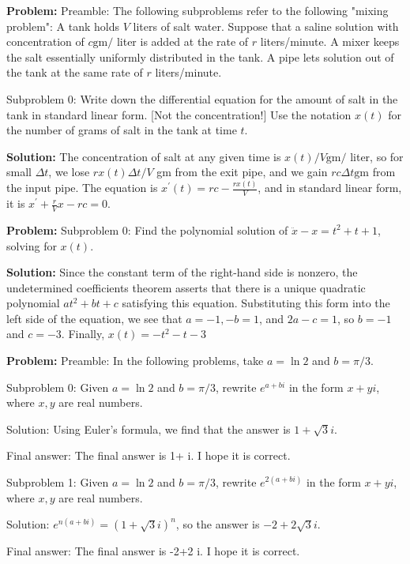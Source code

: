 \documentclass[10pt]{article}
\begin{document}
\textbf{Problem:}
Preamble: The following subproblems refer to the following "mixing problem": A tank holds $V$ liters of salt water. Suppose that a saline solution with concentration of $c \mathrm{gm} /$ liter is added at the rate of $r$ liters/minute. A mixer keeps the salt essentially uniformly distributed in the tank. A pipe lets solution out of the tank at the same rate of $r$ liters/minute. 

Subproblem 0: Write down the differential equation for the amount of salt in the tank in standard linear form. [Not the concentration!] Use the notation $x(t)$ for the number of grams of salt in the tank at time $t$.


\textbf{Solution:}
The concentration of salt at any given time is $x(t) / V \mathrm{gm} /$ liter, so for small $\Delta t$, we lose $r x(t) \Delta t / V$ gm from the exit pipe, and we gain $r c \Delta t \mathrm{gm}$ from the input pipe. The equation is $x^{\prime}(t)=r c-\frac{r x(t)}{V}$, and in standard linear form, it is
$\boxed{x^{\prime}+\frac{r}{V} x-r c=0}$.


\textbf{Problem:}
Subproblem 0: Find the polynomial solution of $\ddot{x}-x=t^{2}+t+1$, solving for $x(t)$.


\textbf{Solution:}
Since the constant term of the right-hand side is nonzero, the undetermined coefficients theorem asserts that there is a unique quadratic polynomial $a t^{2}+b t+c$ satisfying this equation. Substituting this form into the left side of the equation, we see that $a=-1,-b=1$, and $2 a-c=1$, so $b=-1$ and $c=-3$. Finally, $x(t) = \boxed{-t^2 - t - 3}$


\textbf{Problem:}
Preamble: In the following problems, take $a = \ln 2$ and $b = \pi / 3$. 

Subproblem 0: Given $a = \ln 2$ and $b = \pi / 3$, rewrite $e^{a+b i}$ in the form $x + yi$, where $x, y$ are real numbers. 


Solution: Using Euler's formula, we find that the answer is $\boxed{1+\sqrt{3} i}$.

Final answer: The final answer is 1+ i. I hope it is correct.

Subproblem 1: Given $a = \ln 2$ and $b = \pi / 3$, rewrite $e^{2(a+b i)}$ in the form $x + yi$, where $x, y$ are real numbers.


Solution: $e^{n(a+b i)}=(1+\sqrt{3} i)^{n}$, so the answer is $\boxed{-2+2 \sqrt{3} i}$.

Final answer: The final answer is -2+2  i. I hope it is correct.
\end{document}

